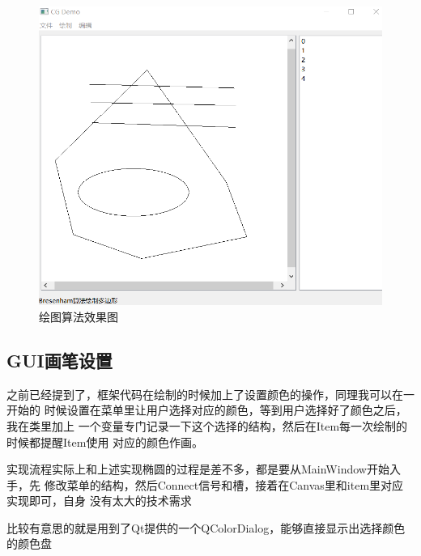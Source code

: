 \documentclass[a4paper,UTF8]{article}
\theoremstyle{definition}
\begin{document}
\begin{figure}[h]
	\centering
	\includegraphics[scale=0.4]{figure/draw.png}
	\caption{绘图算法效果图}
	\label{fig:DrawGUI}
\end{figure}

\subsection{GUI画笔设置}
之前已经提到了，框架代码在绘制的时候加上了设置颜色的操作，同理我可以在一开始的
时候设置在菜单里让用户选择对应的颜色，等到用户选择好了颜色之后，我在类里加上
一个变量专门记录一下这个选择的结构，然后在Item每一次绘制的时候都提醒Item使用
对应的颜色作画。

实现流程实际上和上述实现椭圆的过程是差不多，都是要从MainWindow开始入手，先
修改菜单的结构，然后Connect信号和槽，接着在Canvas里和item里对应实现即可，自身
没有太大的技术需求

比较有意思的就是用到了Qt提供的一个QColorDialog，能够直接显示出选择颜色的颜色盘
\end{document}
